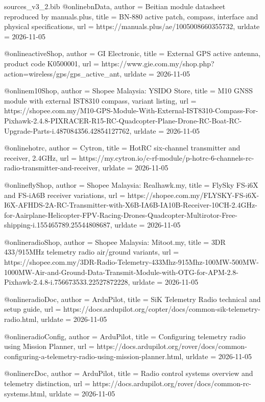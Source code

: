 \begin{filecontents*}[overwrite]{sources_v3_2.bib}
@online{bnData,
  author = {Beitian module datasheet reproduced by manuals.plus},
  title = {BN-880 active patch, compass, interface and physical specifications},
  url = {https://manuals.plus/ae/1005008660355732},
  urldate = {2026-11-05}
}

@online{activeShop,
  author = {GI Electronic},
  title = {External GPS active antenna, product code K0500001},
  url = {https://www.gie.com.my/shop.php?action=wireless/gps/gps_active_ant},
  urldate = {2026-11-05}
}

@online{m10Shop,
  author = {Shopee Malaysia: YSIDO Store},
  title = {M10 GNSS module with external IST8310 compass, variant listing},
  url = {https://shopee.com.my/M10-GPS-Module-With-External-IST8310-Compass-For-Pixhawk-2.4.8-PIXRACER-R15-RC-Quadcopter-Plane-Drone-RC-Boat-RC-Upgrade-Parts-i.487084356.42854127762},
  urldate = {2026-11-05}
}

@online{hotrc,
  author = {Cytron},
  title = {HotRC six-channel transmitter and receiver, 2.4GHz},
  url = {https://my.cytron.io/c-rf-module/p-hotrc-6-channels-rc-radio-transmitter-and-receiver},
  urldate = {2026-11-05}
}

@online{flyShop,
  author = {Shopee Malaysia: Realhawk.my},
  title = {FlySky FS-i6X and FS-iA6B receiver variations},
  url = {https://shopee.com.my/FLYSKY-FS-i6X-I6X-AFHDS-2A-RC-Transmitter-with-X6B-IA6B-IA10B-Receiver-10CH-2.4GHz-for-Aairplane-Helicopter-FPV-Racing-Drones-Quadcopter-Multirotor-Free-shipping-i.155465789.25544808687},
  urldate = {2026-11-05}
}

@online{radioShop,
  author = {Shopee Malaysia: Mitoot.my},
  title = {3DR 433/915MHz telemetry radio air/ground variants},
  url = {https://shopee.com.my/3DR-Radio-Telemetry-433Mhz-915Mhz-100MW-500MW-1000MW-Air-and-Ground-Data-Transmit-Module-with-OTG-for-APM-2.8-Pixhawk-2.4.8-i.756673533.22527872228},
  urldate = {2026-11-05}
}

@online{radioDoc,
  author = {ArduPilot},
  title = {SiK Telemetry Radio technical and setup guide},
  url = {https://docs.ardupilot.org/copter/docs/common-sik-telemetry-radio.html},
  urldate = {2026-11-05}
}

@online{radioConfig,
  author = {ArduPilot},
  title = {Configuring telemetry radio using Mission Planner},
  url = {https://docs.ardupilot.org/rover/docs/common-configuring-a-telemetry-radio-using-mission-planner.html},
  urldate = {2026-11-05}
}

@online{rcDoc,
  author = {ArduPilot},
  title = {Radio control systems overview and telemetry distinction},
  url = {https://docs.ardupilot.org/rover/docs/common-rc-systems.html},
  urldate = {2026-11-05}
}


\end{filecontents*}
